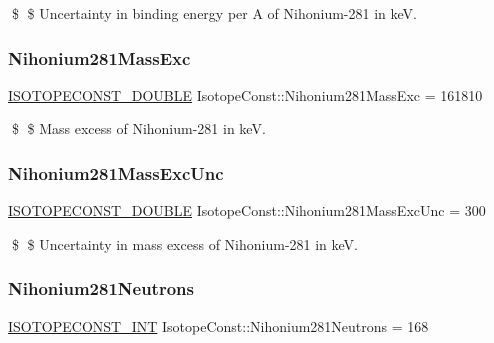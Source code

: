 \$ \$ Uncertainty in binding energy per A of Nihonium-\/281 in keV. \mbox{\label{group___isotope_const-_nihonium-_nh281_ga08b7ac37defacb28a1f97e96048ddebe}} 
\subsubsection{\texorpdfstring{Nihonium281\+Mass\+Exc}{Nihonium281MassExc}}
{\footnotesize\ttfamily \mbox{\hyperlink{group___isotope_const-_macros_ga8f45a7272ce02c0b4c65c44636ed719a}{I\+S\+O\+T\+O\+P\+E\+C\+O\+N\+S\+T\+\_\+\+D\+O\+U\+B\+LE}} Isotope\+Const\+::\+Nihonium281\+Mass\+Exc = 161810}

\$ \$ Mass excess of Nihonium-\/281 in keV. \mbox{\label{group___isotope_const-_nihonium-_nh281_ga8a4e3ad03dc9f149d4ec2732504ff130}} 
\subsubsection{\texorpdfstring{Nihonium281\+Mass\+Exc\+Unc}{Nihonium281MassExcUnc}}
{\footnotesize\ttfamily \mbox{\hyperlink{group___isotope_const-_macros_ga8f45a7272ce02c0b4c65c44636ed719a}{I\+S\+O\+T\+O\+P\+E\+C\+O\+N\+S\+T\+\_\+\+D\+O\+U\+B\+LE}} Isotope\+Const\+::\+Nihonium281\+Mass\+Exc\+Unc = 300}

\$ \$ Uncertainty in mass excess of Nihonium-\/281 in keV. \mbox{\label{group___isotope_const-_nihonium-_nh281_ga86c1c0aa70cdc449d02fd5b8f0df7e89}} 
\subsubsection{\texorpdfstring{Nihonium281\+Neutrons}{Nihonium281Neutrons}}
{\footnotesize\ttfamily \mbox{\hyperlink{group___isotope_const-_macros_ga5f18360b3e99483a35c32d789e62621c}{I\+S\+O\+T\+O\+P\+E\+C\+O\+N\+S\+T\+\_\+\+I\+NT}} Isotope\+Const\+::\+Nihonium281\+Neutrons = 168}

